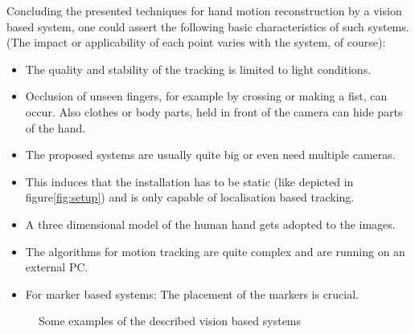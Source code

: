 Concluding the presented techniques for hand motion reconstruction by a vision based system, one could assert the following basic characteristics of such systems. (The impact or applicability of each point varies with the system, of course):
\begin{itemize}
\item The quality and stability of the tracking is limited to light conditions.
\item Occlusion of unseen fingers, for example by crossing or making a fist, can occur. Also clothes or body parts, held in front of the camera can hide parts of the hand.
\item The proposed systems are usually quite big or even need multiple cameras.
\item This induces that the installation has to be static (like depicted in figure\ref{fig:setup}) and is only capable of localisation based tracking.
\item A three dimensional model of the human hand gets adopted to the images.
\item The algorithms for motion tracking are quite complex and are running on an external PC.
\item For marker based systems: The placement of the markers is crucial.
\end{itemize}

\begin{figure}[hp]
	\centering
	\hfill
	\hfill
	\hfill
	\hfill
	
	\caption{Some examples of the described vision based systems}
	\label{fig:examplesVision}	
\end{figure}

\newpage


